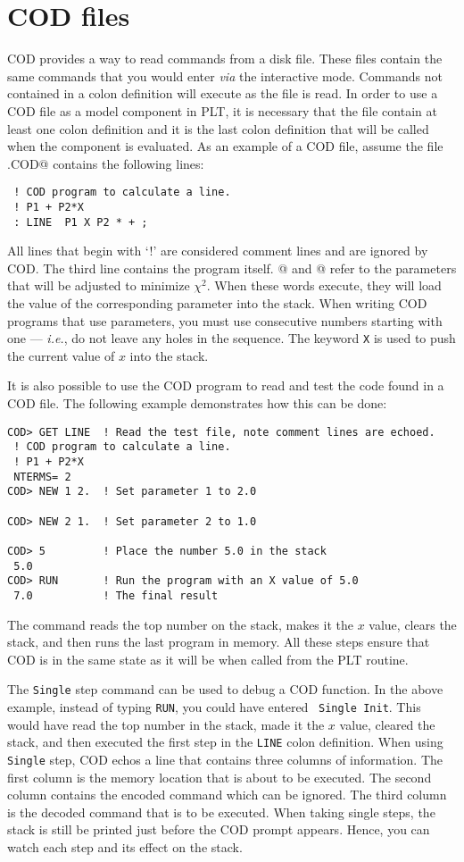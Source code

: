 \section{COD files}
COD provides a way to read commands from a disk file.
These files contain the same commands
that you would enter {\it via} the interactive mode.
Commands not contained in a colon definition will execute as the file is read.
In order to use a COD file as a model component in PLT,
it is necessary that the file contain at least one colon definition
and it is the last colon definition that will be called
when the component is evaluated.
As an example of a COD file,
assume the file \verb@LINE.COD@ contains the following lines:
\begin{verbatim}
 ! COD program to calculate a line.
 ! P1 + P2*X
 : LINE  P1 X P2 * + ;
\end{verbatim}
All lines that begin with `!' are considered comment lines
and are ignored by COD.
The third line contains the program itself.
@ and @ refer to the parameters
that will be adjusted to minimize $\chi^2$.
When these words execute,
they will load the value of the corresponding parameter into the stack.
When writing COD programs that use parameters,
you must use consecutive numbers starting with one --- {\it i.e.},
do not leave any holes in the sequence.
The keyword {\tt X} is used to push the current value of $x$ into the stack.

   It is also possible to use the COD program to read and test
the code found in a COD file.
The following example demonstrates how this can be done:
\begin{verbatim}
COD> GET LINE  ! Read the test file, note comment lines are echoed.
 ! COD program to calculate a line.
 ! P1 + P2*X
 NTERMS= 2
COD> NEW 1 2.  ! Set parameter 1 to 2.0

COD> NEW 2 1.  ! Set parameter 2 to 1.0

COD> 5         ! Place the number 5.0 in the stack
 5.0
COD> RUN       ! Run the program with an X value of 5.0
 7.0           ! The final result
\end{verbatim}
The \verb@RUN@ command reads the top number on the stack,
makes it the $x$ value,
clears the stack,
and then runs the last program in memory.
All these steps ensure that COD is in the same state as
it will be when called from the PLT routine.

The {\tt Single} step command can be used to debug a COD function.
In the above example, instead of typing {\tt RUN},
you could have entered \, {\tt Single~Init}.
This would have read the top number in the stack,
made it the $x$ value,
cleared the stack,
and then executed the first step in the {\tt LINE} colon definition.
When using {\tt Single} step,
COD echos a line that contains three columns of information.
The first column is the memory location that is about to be executed.
The second column contains the encoded command which can be ignored.
The third column is the decoded command that is to be executed.
When taking single steps,
the stack is still be printed just before the COD prompt appears.
Hence, you can watch each step and its effect on the stack.

